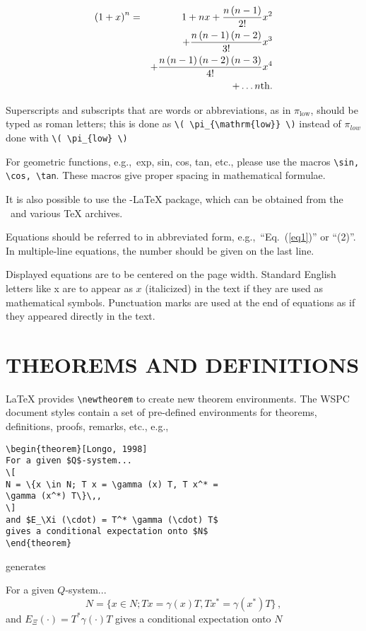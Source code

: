 \documentclass{ws-bme}
\begin{document}
\begin{multicols}{2}
\begin{eqnarray}
\left(1+x\right)^n &=& 1 + nx + \frac{n\left(n-1\right)}{2!}x^2 \nonumber\\
  & & + \frac{n\left(n-1\right)\left(n-2\right)}{3!}x^3 \nonumber\\
  & & + \frac{n\left(n-1\right)\left(n-2\right)\left(n-3\right)}{4!}x^4 \nonumber\\
  & & + \ldots n{\rm th}.
\end{eqnarray}

Superscripts and subscripts that are words or abbreviations, as in
\( \pi_{\mathrm{low}} \), should be typed as roman letters;
this is done as \verb|\( \pi_{\mathrm{low}} \)|
instead of \( \pi_{low} \) done with \verb|\( \pi_{low} \)|

For geometric functions, e.g.,~exp, sin, cos, tan, etc., please use the macros
\verb|\sin, \cos, \tan|. These macros give proper spacing in mathematical formulae.

It is also possible to use the \AmS-\LaTeX{}
package, which can be obtained from the \AmS\ and various \TeX{}
archives.

Equations should be referred to in abbreviated form,
e.g.,~``Eq.~(\ref{eq1})'' or ``(2)''. In multiple-line equations,
the number should be given on the last line.

Displayed equations are to be centered on the page width. Standard
English letters like x are to appear as $x$ (italicized) in the
text if they are used as mathematical symbols. Punctuation marks
are used at the end of equations as if they appeared directly in
the text.

\section*{THEOREMS AND DEFINITIONS}
\LaTeX{} provides \verb|\newtheorem| to create new theorem
environments. The WSPC document styles contain a set of pre-defined
environments for theorems, definitions, proofs, remarks, etc., e.g.,
\begin{verbatim}
\begin{theorem}[Longo, 1998]
For a given $Q$-system...
\[
N = \{x \in N; T x = \gamma (x) T, T x^* =
\gamma (x^*) T\}\,,
\]
and $E_\Xi (\cdot) = T^* \gamma (\cdot) T$
gives a conditional expectation onto $N$
\end{theorem}
\end{verbatim}

\noindent generates

\begin{theorem}[Longo, 1998]
For a given $Q$-system...
\[
N = \{x \in N; T x = \gamma (x) T, T x^* = \gamma (x^*) T\}\,,
\]
and $E_\Xi (\cdot) = T^* \gamma (\cdot) T$ gives a conditional
expectation onto $N$
\end{theorem}


\end{multicols}
\end{document}
